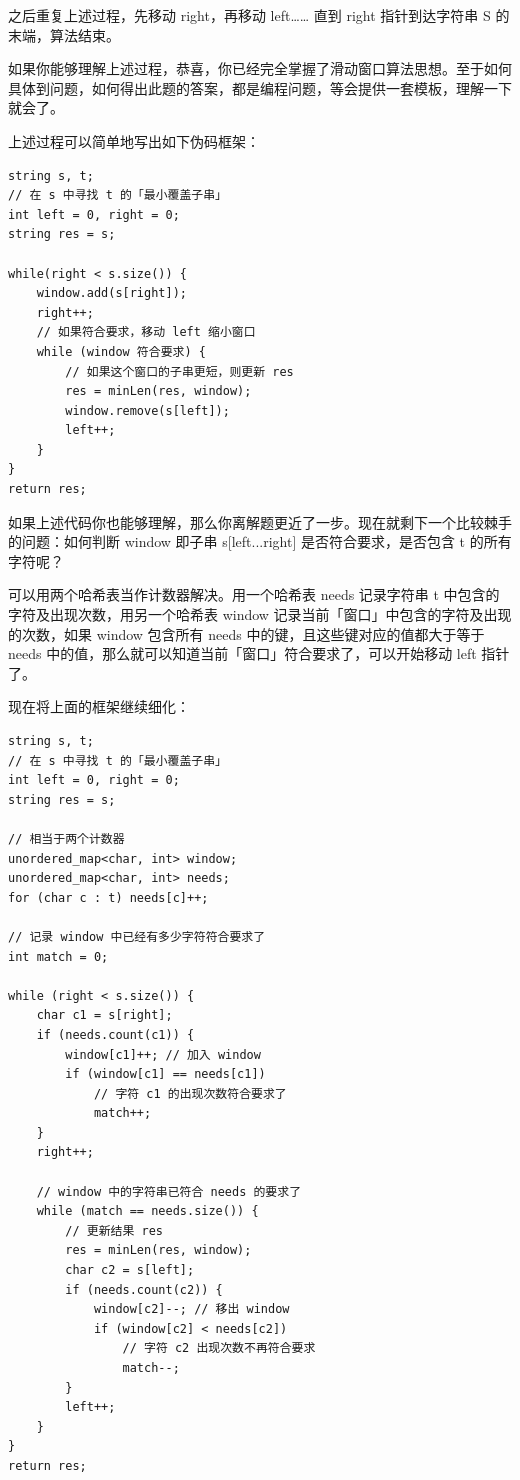\documentclass[12pt]{article}
\begin{document}
之后重复上述过程，先移动 right，再移动 left…… 直到 right 指针到达字符串 S 的末端，算法结束。

如果你能够理解上述过程，恭喜，你已经完全掌握了滑动窗口算法思想。至于如何具体到问题，如何得出此题的答案，都是编程问题，等会提供一套模板，理解一下就会了。

上述过程可以简单地写出如下伪码框架：
\begin{lstlisting}
string s, t;
// 在 s 中寻找 t 的「最小覆盖子串」
int left = 0, right = 0;
string res = s;

while(right < s.size()) {
    window.add(s[right]);
    right++;
    // 如果符合要求，移动 left 缩小窗口
    while (window 符合要求) {
        // 如果这个窗口的子串更短，则更新 res
        res = minLen(res, window);
        window.remove(s[left]);
        left++;
    }
}
return res;
\end{lstlisting}

如果上述代码你也能够理解，那么你离解题更近了一步。现在就剩下一个比较棘手的问题：如何判断 window 即子串 s[left...right] 是否符合要求，是否包含 t 的所有字符呢？

可以用两个哈希表当作计数器解决。用一个哈希表 needs 记录字符串 t 中包含的字符及出现次数，用另一个哈希表 window 记录当前「窗口」中包含的字符及出现的次数，如果 window 包含所有 needs 中的键，且这些键对应的值都大于等于 needs 中的值，那么就可以知道当前「窗口」符合要求了，可以开始移动 left 指针了。

现在将上面的框架继续细化：
\begin{lstlisting}
string s, t;
// 在 s 中寻找 t 的「最小覆盖子串」
int left = 0, right = 0;
string res = s;

// 相当于两个计数器
unordered_map<char, int> window;
unordered_map<char, int> needs;
for (char c : t) needs[c]++;

// 记录 window 中已经有多少字符符合要求了
int match = 0; 

while (right < s.size()) {
    char c1 = s[right];
    if (needs.count(c1)) {
        window[c1]++; // 加入 window
        if (window[c1] == needs[c1])
            // 字符 c1 的出现次数符合要求了
            match++;
    }
    right++;

    // window 中的字符串已符合 needs 的要求了
    while (match == needs.size()) {
        // 更新结果 res
        res = minLen(res, window);
        char c2 = s[left];
        if (needs.count(c2)) {
            window[c2]--; // 移出 window
            if (window[c2] < needs[c2])
                // 字符 c2 出现次数不再符合要求
                match--;
        }
        left++;
    }
}
return res;
\end{lstlisting}
\end{document}
